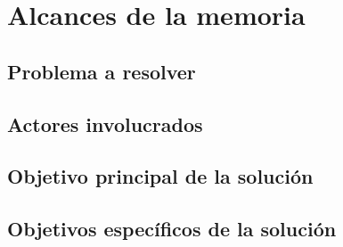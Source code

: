 \chapter{Alcances de la memoria}
\label{alcansces}

\section{Problema a resolver}
\section{Actores involucrados}
\section{Objetivo principal de la solución}
\section{Objetivos específicos de la solución}

